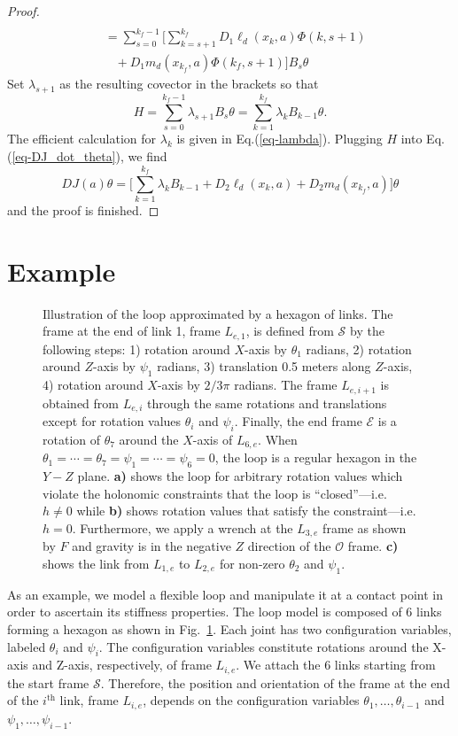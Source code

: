 \documentclass[letterpaper, 10pt, conference]{ieeeconf}
\begin{document}
\begin{proof}
\[\begin{array}{l}
\\\hspace{10pt} = \sum_{s=0}^{k_f-1}\Big[\sum_{k = s+1}^{k_f}D_1\ell_d(x_k,a) \Phi(k,s+1) \\\hspace{20pt}+ D_1m_d(x_{k_f},a)\Phi(k_f,s+1)\Big]B_s\theta
\end{array}
\]
Set $\lambda_{s+1}$ as the resulting covector in the brackets so that 
\[
H = \sum_{s=0}^{k_f-1} \lambda_{s+1} B_s\theta = \sum_{k=1}^{k_f} \lambda_{k} B_{k-1}\theta.
\]
The efficient calculation for $\lambda_k$ is given in Eq.(\ref{eq-lambda}).  Plugging $H$ into Eq.(\ref{eq-DJ_dot_theta}), we find
\[
DJ(a)\theta = \Big[\sum_{k = 1}^{k_f}\lambda_kB_{k-1} +D_2\ell_d(x_k,a) + D_2m_d(x_{k_f},a)\Big]\theta
\]
and the proof is finished.
\end{proof}

\section{Example}
\begin{figure}
\centering
\def\svgwidth{.97\textwidth}%

\caption{Illustration of the loop approximated by a hexagon of links.  The frame at the end of link 1, frame $L_{e,1}$, is defined from $\mathcal{S}$ by the following steps: 1) rotation around $X$-axis by $\theta_1$ radians, 2) rotation around $Z$-axis by $\psi_1$ radians, 3) translation 0.5 meters along $Z$-axis, 4) rotation around $X$-axis by $2/3\pi$ radians.  The frame $L_{e,{i+1}}$ is obtained from $L_{e,i}$ through the same rotations and translations except for rotation values $\theta_{i}$ and $\psi_{i}$.  Finally, the end frame $\mathcal{E}$ is a rotation of $\theta_7$ around the $X$-axis of $L_{6,e}$.  When $\theta_1 = \cdots = \theta_7 = \psi_1 = \cdots = \psi_6 = 0$, the loop is a regular hexagon in the $Y-Z$ plane.  \textbf{a)} shows the loop for arbitrary rotation values which violate the holonomic constraints that the loop is ``closed''---i.e. $h\neq 0$ while \textbf{b)} shows rotation values that satisfy the constraint---i.e. $h = 0$.  Furthermore, we apply a wrench at the $L_{3,e}$ frame as shown by $F$ and gravity is in the negative $Z$ direction of the $\mathcal{O}$ frame. \textbf{c)} shows the link from $L_{1,e}$ to $L_{2,e}$ for non-zero $\theta_2$ and $\psi_1$. }
\label{fig-loop}
\end{figure}

As an example, we model a flexible loop and manipulate it at a contact point in order to ascertain its stiffness properties.  The loop model is composed of 6 links forming a hexagon as shown in Fig.~\ref{fig-loop}.  Each joint has two configuration variables, labeled $\theta_i$ and $\psi_i$.  The configuration variables constitute rotations around the X-axis and Z-axis, respectively, of frame $L_{i,e}$.  We attach the 6 links starting from the start frame $\mathcal{S}$.  Therefore, the position and orientation of the frame at the end of the $i^\textrm{th}$ link, frame $L_{i,e}$, depends on the configuration variables $\theta_1,\ldots,\theta_{i-1}$ and $\psi_1,\ldots,\psi_{i-1}$.  
\end{document}

